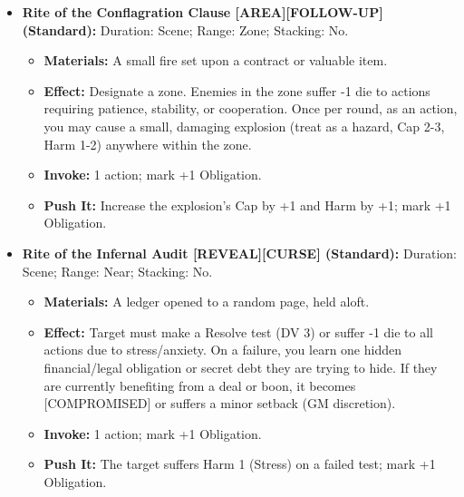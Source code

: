 \begin{itemize}[leftmargin=*]
    \item \textbf{Rite of the Conflagration Clause [AREA][FOLLOW-UP] (Standard):} Duration: Scene; Range: Zone; Stacking: No.
    \begin{itemize}
        \item \textbf{Materials:} A small fire set upon a contract or valuable item.
        \item \textbf{Effect:} Designate a zone. Enemies in the zone suffer -1 die to actions requiring patience, stability, or cooperation. Once per round, as an action, you may cause a small, damaging explosion (treat as a hazard, Cap 2-3, Harm 1-2) anywhere within the zone.
        \item \textbf{Invoke:} 1 action; mark +1 Obligation.
        \item \textbf{Push It:} Increase the explosion's Cap by +1 and Harm by +1; mark +1 Obligation.
    \end{itemize}
    \item \textbf{Rite of the Infernal Audit [REVEAL][CURSE] (Standard):} Duration: Scene; Range: Near; Stacking: No.
    \begin{itemize}
        \item \textbf{Materials:} A ledger opened to a random page, held aloft.
        \item \textbf{Effect:} Target must make a Resolve test (DV 3) or suffer -1 die to all actions due to stress/anxiety. On a failure, you learn one hidden financial/legal obligation or secret debt they are trying to hide. If they are currently benefiting from a deal or boon, it becomes [COMPROMISED] or suffers a minor setback (GM discretion).
        \item \textbf{Invoke:} 1 action; mark +1 Obligation.
        \item \textbf{Push It:} The target suffers Harm 1 (Stress) on a failed test; mark +1 Obligation.
    \end{itemize}
\end{itemize}

